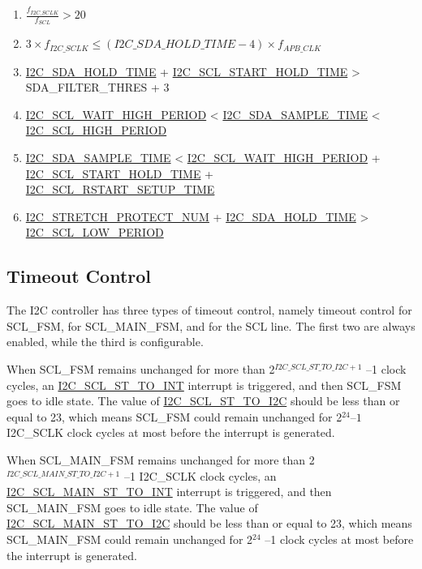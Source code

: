 \documentclass[main\_\_EN.tex]{subfiles}
\begin{document}
\begin{enumerate}
\item $\frac{f_{I2C\_SCLK}}{f_{SCL}}  > 20$
\item $3 \times f_{I2C\_SCLK} \leq (\hyperref[fielddesc:I2CSDAHOLDTIME]{I2C\_SDA\_HOLD\_TIME}-4) \times f_{APB\_CLK}$
\item \hyperref[fielddesc:I2CSDAHOLDTIME]{I2C\_SDA\_HOLD\_TIME} + \hyperref[fielddesc:I2CSCLSTARTHOLDTIME]{I2C\_SCL\_START\_HOLD\_TIME} > SDA\_FILTER\_THRES + 3
\item \hyperref[fielddesc:I2CSCLWAITHIGHPERIOD]{I2C\_SCL\_WAIT\_HIGH\_PERIOD} < \hyperref[fielddesc:I2CSDASAMPLETIME]{I2C\_SDA\_SAMPLE\_TIME} < \hyperref[fielddesc:I2CSCLHIGHPERIOD]{I2C\_SCL\_HIGH\_PERIOD}
\item \hyperref[fielddesc:I2CSDASAMPLETIME]{I2C\_SDA\_SAMPLE\_TIME} < \hyperref[fielddesc:I2CSCLWAITHIGHPERIOD]{I2C\_SCL\_WAIT\_HIGH\_PERIOD} + \hyperref[fielddesc:I2CSCLSTARTHOLDTIME]{I2C\_SCL\_START\_HOLD\_TIME} + \\\hyperref[fielddesc:I2CSCLRSTARTSETUPTIME]{I2C\_SCL\_RSTART\_SETUP\_TIME}
\item \hyperref[fielddesc:I2CSTRETCHPROTECTNUM]{I2C\_STRETCH\_PROTECT\_NUM} + \hyperref[fielddesc:I2CSDAHOLDTIME]{I2C\_SDA\_HOLD\_TIME} > \hyperref[fielddesc:I2CSCLLOWPERIOD]{I2C\_SCL\_LOW\_PERIOD}
\end{enumerate}

\subsection{Timeout Control}

The I2C controller has three types of timeout control, namely timeout control for SCL\_FSM, for SCL\_MAIN\_FSM, and for the SCL line. The first two are always enabled, while the third is configurable.

When SCL\_FSM remains unchanged for more than 2$^{\hyperref[fielddesc:I2CSCLSTTOI2C]{I2C\_SCL\_ST\_TO\_I2C}+1}$ –1 clock cycles, an \hyperref[int:i2c-scl-fsm]{I2C\_SCL\_ST\_TO\_INT} interrupt is triggered, and then SCL\_FSM goes to idle state. The value of \hyperref[fielddesc:I2CSCLSTTOI2C]{I2C\_SCL\_ST\_TO\_I2C} should be less than or equal to 23, which means SCL\_FSM could remain unchanged for 2$^{24}–1 $ I2C\_SCLK clock cycles at most before the interrupt is generated.

When SCL\_MAIN\_FSM remains unchanged for more than 2$^{ \hyperref[fielddesc:I2CSCLMAINSTTOI2C]{I2C\_SCL\_MAIN\_ST\_TO\_I2C}+1}$ –1 I2C\_SCLK clock cycles, an \hyperref[int:i2c-scl-main-fsm]{I2C\_SCL\_MAIN\_ST\_TO\_INT} interrupt is triggered, and then SCL\_MAIN\_FSM goes to idle state. The value of \hyperref[fielddesc:I2CSCLMAINSTTOI2C]{I2C\_SCL\_MAIN\_ST\_TO\_I2C} should be less than or equal to 23, which means SCL\_MAIN\_FSM could remain unchanged for 2$^{24}$ –1 clock cycles at most before the interrupt is generated.
\end{document}
